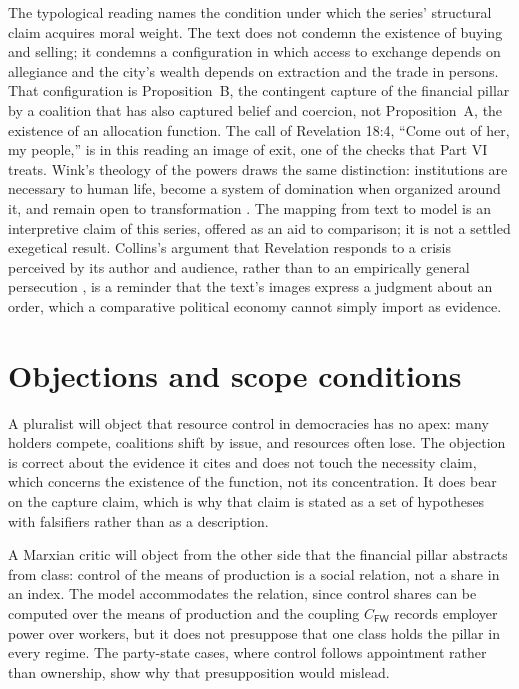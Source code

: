 \documentclass[11pt,letterpaper]{article}
\theoremstyle{definition}
\theoremstyle{remark}
\newcommand{\pF}{\mathsf{F}}
\newcommand{\pW}{\mathsf{W}}
\begin{document}
The typological reading names the condition under which the series' structural claim acquires moral weight. The text does not condemn the existence of buying and selling; it condemns a configuration in which access to exchange depends on allegiance and the city's wealth depends on extraction and the trade in persons. That configuration is Proposition~B, the contingent capture of the financial pillar by a coalition that has also captured belief and coercion, not Proposition~A, the existence of an allocation function. The call of Revelation 18:4, ``Come out of her, my people,'' is in this reading an image of exit, one of the checks that Part VI treats. Wink's theology of the powers draws the same distinction: institutions are necessary to human life, become a system of domination when organized around it, and remain open to transformation \citep{wink1992}. The mapping from text to model is an interpretive claim of this series, offered as an aid to comparison; it is not a settled exegetical result. Collins's argument that Revelation responds to a crisis perceived by its author and audience, rather than to an empirically general persecution \citep{collins1984}, is a reminder that the text's images express a judgment about an order, which a comparative political economy cannot simply import as evidence.

\section{Objections and scope conditions}
\label{sec:objections}

A pluralist will object that resource control in democracies has no apex: many holders compete, coalitions shift by issue, and resources often lose. The objection is correct about the evidence it cites \citep{baumgartner2009,ansolabehere2003} and does not touch the necessity claim, which concerns the existence of the function, not its concentration. It does bear on the capture claim, which is why that claim is stated as a set of hypotheses with falsifiers rather than as a description.

A Marxian critic will object from the other side that the financial pillar abstracts from class: control of the means of production is a social relation, not a share in an index. The model accommodates the relation, since control shares can be computed over the means of production and the coupling $C_{\pF\pW}$ records employer power over workers, but it does not presuppose that one class holds the pillar in every regime. The party-state cases, where control follows appointment rather than ownership, show why that presupposition would mislead.
\end{document}
